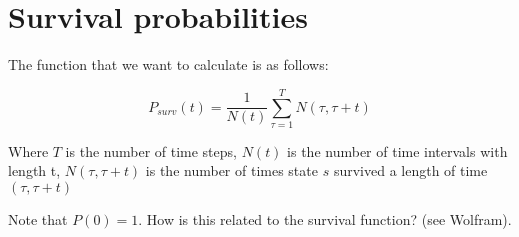 \documentclass[12pt]{article}
\begin{document}
\section{Survival probabilities}
The function that we want to calculate is as follows:

\[P_{surv}(t)=\frac{1}{N(t)}\sum_{\tau =1}^{T} N(\tau,\tau+t)\]

Where $T$ is the number of time steps, $N(t)$ is the number of
time intervals with length t, $N(\tau,\tau+t)$ is the number of
times state $s$ survived a length of time $(\tau, \tau+t)$

Note that $P(0)=1$. How is this related to the survival function?
(see Wolfram).
\end{document}
